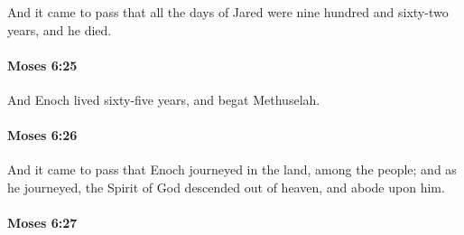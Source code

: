 			And it came to pass that all the days of Jared were nine hundred and sixty-two years, and he died.


		\paragraph{Moses 6:25} %
			\label{MOSES-6-25}

			And Enoch lived sixty-five years, and begat Methuselah.


		\paragraph{Moses 6:26} %
			\label{MOSES-6-26}

			And it came to pass that Enoch journeyed in the land, among the people; and as he journeyed, the Spirit of God descended out of heaven, and abode upon him.


		\paragraph{Moses 6:27} %
			\label{MOSES-6-27}

